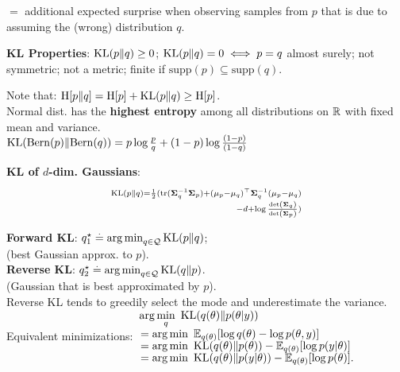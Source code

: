 $=$ additional expected surprise when observing samples from $p$ that is due to assuming the (wrong) distribution $q$.
\begin{framed}
    \textbf{KL Properties}:
    $\KL{p}{q} \geq 0$; $\KL{p}{q} = 0 \iff p = q$ almost surely; not symmetric; not a metric; finite if $\textrm{supp}(p) \subseteq \textrm{supp}(q)$.
\end{framed}
Note that: $\crH{p}{q} = \H{p} + \KL{p}{q} \geq \H{p}$.\\
Normal dist. has the \textbf{highest entropy} among all distributions on $\mathbb{R}$ with fixed mean and variance. \\
$\KL{\Bern{p}}{\Bern{q}} = p \log \frac{p}{q} + (1-p) \log \frac{(1-p)}{(1-q)}$  \\
\begin{framed}
    \textbf{KL of $d$-dim. Gaussians}: \\
    \vspace{6pt}
    \begin{align*}
        \scriptstyle\mathrm{KL}\left(p \| q\right) = \frac{1}{2} (\mathrm{tr}(\mathbf{\Sigma}_q^{-1} \mathbf{\Sigma}_p)+ (\mathbf{\mu}_p - \mathbf{\mu}_q)^\top \mathbf{\Sigma}_q^{-1} (\mathbf{\mu}_p - \mathbf{\mu}_q) \\[-1mm]
        \scriptstyle - d + \log \frac{\mathrm{det}\left(\mathbf{\Sigma}_q\right)}{\mathrm{det}\left(\mathbf{\Sigma}_p\right)})
    \end{align*}
\end{framed}
\textbf{Forward KL}: $\qs_1 \defeq \argmin_{q \in \spQ} \KL{p}{q}$;\\
(best Gaussian approx.   to $p$).\\
\textbf{Reverse KL}: $\qs_2 \defeq \argmin_{q \in \spQ} \KL{q}{p}$.\\
(Gaussian that is best approximated by $p$).\\
Reverse KL tends to greedily select the mode and underestimate the variance.
Equivalent minimizations:
$\begin{aligned}
    \begin{aligned}
        &  \arg \min_q ~
         \KL{q(\theta)}{p(\theta | y)} \\[-1.5mm]
        &= \arg \min~
         \mathbb{E}_{q(\theta)}[\log q(\theta) - \log p(\theta, y)] \\[-1.5mm]
        &= \arg \min~
         \KL{q(\theta)}{p(\theta)} - \mathbb{E}_{q(\theta)}[\log p(y | \theta)] \\[-1.5mm]
        &= \arg \min~
         \KL{q(\theta)}{p(y | \theta)} - \mathbb{E}_{q(\theta)}[\log p(\theta)].
    \end{aligned}
\end{aligned}$
